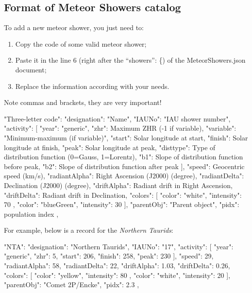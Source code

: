 \subsection{Format of Meteor Showers catalog}
\label{sec:plugins:MeteorShowers:format}

To add a new meteor shower, you just need to:
\begin{enumerate}
\item Copy the code of some valid meteor shower;
\item Paste it in the line 6 (right after the ``showers'': \{) of the MeteorShowers.json document;
\item Replace the information according with your needs.
\end{enumerate}
Note commas and brackets, they are very important!

\begin{configfile}[\footnotesize]
"Three-letter code":
    {
        "designation": "Name",
        "IAUNo": "IAU shower number",
        "activity":
        [{
            "year": "generic",
            "zhr": Maximum ZHR (-1 if variable),
            "variable": "Minimum-maximum (if variable)",
            "start": Solar longitude at start,
            "finish": Solar longitude at finish,
            "peak": Solar longitude at peak,
            "disttype": Type of distribution function
                        (0=Gauss, 1=Lorentz),
            "b1": Slope of distribution function
                  before peak,
            "b2": Slope of distribution function
                  after peak
        }],
        "speed": Geocentric speed (km/s),
        "radiantAlpha": Right Ascension (J2000) (degree),
        "radiantDelta": Declination (J2000) (degree),
        "driftAlpha": Radiant drift in Right Ascension,
        "driftDelta": Radiant drift in Declination,
        "colors":
        [{
            "color": "white",
            "intensity": 70
         },
         {
            "color": "blueGreen",
            "intensity": 30
         }],
        "parentObj": "Parent object",
        "pidx": population index
    },
\end{configfile}

For example, below is a record for the \textit{Northern Taurids}:

\begin{configfile}[\scriptsize]
"NTA":
    {
        "designation": "Northern Taurids",
        "IAUNo": "17",
        "activity":
        [{
            "year": "generic",
            "zhr": 5,
            "start": 206,
            "finish": 258,
            "peak": 230
         }],
        "speed": 29,
        "radiantAlpha": 58,
        "radiantDelta": 22,
        "driftAlpha": 1.03,
        "driftDelta": 0.26,
        "colors":
        [{
            "color": "yellow",
            "intensity": 80
         },
         {
            "color": "white",
            "intensity": 20
         }],
        "parentObj": "Comet 2P/Encke",
        "pidx": 2.3
    },
\end{configfile}

